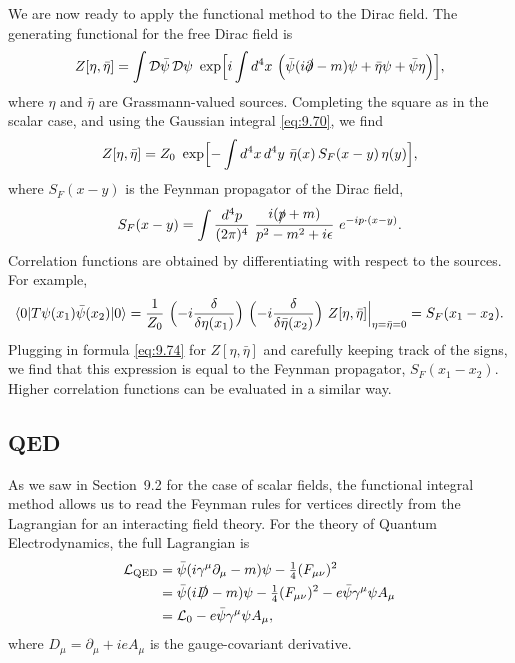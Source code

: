We are now ready to apply the functional method to the Dirac field.  The
generating functional for the free Dirac field is
\begin{equation}
  Z[\eta, \bar{\eta}] = \int \mathcal{D}\bar{\psi}\,\mathcal{D}\psi\
    \exp\Bigl[ i\int d^4x\ \Bigl( \bar{\psi}(i\slashed{\partial}-m)\psi
      + \bar{\eta}\psi + \bar{\psi}\eta \Bigr) \Bigr] ,
  \label{eq:9.71}
\end{equation}
where $\eta$ and $\bar{\eta}$ are Grassmann-valued sources.  Completing the
square as in the scalar case, and using the Gaussian integral
\eqref{eq:9.70}, we find
\begin{equation}
  Z[\eta, \bar{\eta}] = Z_0\ \exp\Bigl[ -\int d^4x\,d^4y\
    \bar{\eta}(x)\,S_F(x-y)\,\eta(y) \Bigr] ,
  \label{eq:9.74}
\end{equation}
where $S_F(x-y)$ is the Feynman propagator of the Dirac field,
\begin{equation}
  S_F(x-y) = \int \frac{d^4p}{(2\pi)^4}\ \frac{i(\slashed{p}+m)}
    {p^2-m^2+i\epsilon}\ e^{-ip\cdot(x-y)} .
\end{equation}
Correlation functions are obtained by differentiating with respect to the
sources.  For example,
\begin{equation}
  \langle 0|T\psi(x_1)\bar{\psi}(x_2)|0\rangle
  = \frac{1}{Z_0}\ \Bigl( -i\frac{\delta}{\delta\eta(x_1)} \Bigr)\
    \Bigl( -i\frac{\delta}{\delta\bar{\eta}(x_2)} \Bigr)\ Z[\eta,\bar{\eta}]
    \Big|_{\eta=\bar{\eta}=0}
  = S_F(x_1-x_2) .
  \label{eq:9.75}
\end{equation}
Plugging in formula \eqref{eq:9.74} for $Z[\eta,\bar{\eta}]$ and carefully
keeping track of the signs, we find that this expression is equal to the
Feynman propagator, $S_F(x_1-x_2)$.  Higher correlation functions can be
evaluated in a similar way.

\subsection{QED}

As we saw in Section~9.2 for the case of scalar fields, the functional
integral method allows us to read the Feynman rules for vertices directly from
the Lagrangian for an interacting field theory.  For the theory of Quantum
Electrodynamics, the full Lagrangian is
\begin{equation}
  \begin{aligned}
    \mathcal{L}_{\mathrm{QED}} &= \bar{\psi}(i\gamma^\mu\partial_\mu-m)\psi
      - \tfrac{1}{4}(F_{\mu\nu})^2\\
    &= \bar{\psi}(i\slashed{D}-m)\psi - \tfrac{1}{4}(F_{\mu\nu})^2
      - e\bar{\psi}\gamma^\mu\psi A_\mu\\
    &= \mathcal{L}_0 - e\bar{\psi}\gamma^\mu\psi A_\mu ,
  \end{aligned}
  \label{eq:9.76}
\end{equation}
where $D_\mu = \partial_\mu + ieA_\mu$ is the gauge-covariant derivative.

